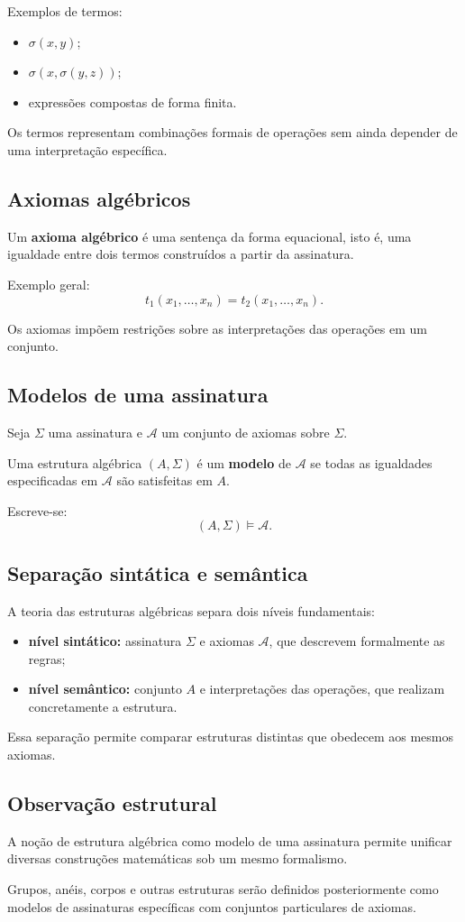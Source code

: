 \documentclass[../../main]{subfiles}
\begin{document}
Exemplos de termos:
\begin{itemize}
	\item $\sigma(x,y)$;
	\item $\sigma(x, \sigma(y,z))$;
	\item expressões compostas de forma finita.
\end{itemize}

Os termos representam combinações formais de operações sem ainda depender de uma interpretação específica.

\subsection{Axiomas algébricos}

Um \textbf{axioma algébrico} é uma sentença da forma equacional, isto é, uma igualdade entre dois termos construídos a partir da assinatura.

Exemplo geral:
\[
	t_1(x_1,\dots,x_n) = t_2(x_1,\dots,x_n).
\]

Os axiomas impõem restrições sobre as interpretações das operações em um conjunto.

\subsection{Modelos de uma assinatura}

Seja $\Sigma$ uma assinatura e $\mathcal{A}$ um conjunto de axiomas sobre $\Sigma$.

Uma estrutura algébrica $(A, \Sigma)$ é um \textbf{modelo} de $\mathcal{A}$ se todas as igualdades especificadas em $\mathcal{A}$ são satisfeitas em $A$.

Escreve-se:
\[
	(A, \Sigma) \vDash \mathcal{A}.
\]

\subsection{Separação sintática e semântica}

A teoria das estruturas algébricas separa dois níveis fundamentais:

\begin{itemize}
	\item \textbf{nível sintático:} assinatura $\Sigma$ e axiomas $\mathcal{A}$, que descrevem formalmente as regras;
	\item \textbf{nível semântico:} conjunto $A$ e interpretações das operações, que realizam concretamente a estrutura.
\end{itemize}

Essa separação permite comparar estruturas distintas que obedecem aos mesmos axiomas.

\subsection{Observação estrutural}

A noção de estrutura algébrica como modelo de uma assinatura permite unificar diversas construções matemáticas sob um mesmo formalismo.

Grupos, anéis, corpos e outras estruturas serão definidos posteriormente como modelos de assinaturas específicas com conjuntos particulares de axiomas.
\end{document}
